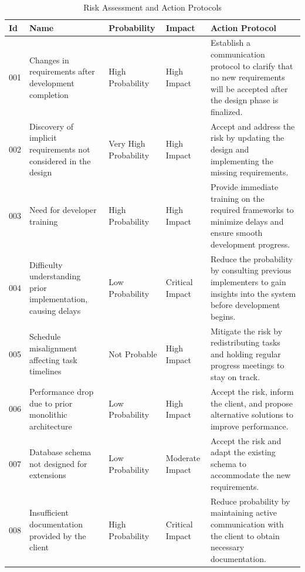 \documentclass{scrreprt}
\begin{document}
\begin{table}[h!]
	\centering \small
	\renewcommand{\arraystretch}{1.5}
	\begin{tabular}{|p{.75cm}|p{4cm}|p{2.5cm}|p{2.5cm}|p{4.75cm}|} 
		\hline
		\textbf{Id} & \textbf{Name} & \textbf{Probability} & \textbf{Impact} & \textbf{Action Protocol} \\ \hline
		001 & Changes in requirements after development completion & High Probability & High Impact & Establish a communication protocol to clarify that no new requirements will be accepted after the design phase is finalized. \\ \hline
		002 & Discovery of implicit requirements not considered in the design & Very High Probability & High Impact & Accept and address the risk by updating the design and implementing the missing requirements. \\ \hline
		003 & Need for developer training & High Probability & High Impact & Provide immediate training on the required frameworks to minimize delays and ensure smooth development progress. \\ \hline
		004 & Difficulty understanding prior implementation, causing delays & Low Probability & Critical Impact & Reduce the probability by consulting previous implementers to gain insights into the system before development begins. \\ \hline
		005 & Schedule misalignment affecting task timelines & Not Probable & High Impact & Mitigate the risk by redistributing tasks and holding regular progress meetings to stay on track. \\ \hline
		006 & Performance drop due to prior monolithic architecture & Low Probability & High Impact & Accept the risk, inform the client, and propose alternative solutions to improve performance. \\ \hline
		007 & Database schema not designed for extensions & Low Probability & Moderate Impact & Accept the risk and adapt the existing schema to accommodate the new requirements. \\ \hline
		008 & Insufficient documentation provided by the client & High Probability & Critical Impact & Reduce probability by maintaining active communication with the client to obtain necessary documentation. \\ \hline
	\end{tabular}
	\caption{Risk Assessment and Action Protocols}
\end{table} \FloatBarrier
\end{document}
